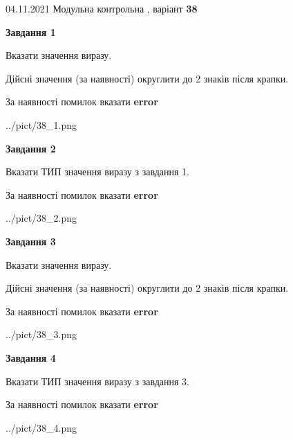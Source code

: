 \documentclass[11pt, ukrainian]{article}
\begin{document}
{04.11.2021 Модульна контрольна , варіант  \No \textbf { 38 }\par}
{
\begin {large}
{\begin {center}\textbf{Завдання 1}\end {center}}\par
Вказати значення виразу. \par
Дійсні значення (за наявності) округлити до 2 знаків після крапки. \par
За наявності помилок вказати \textbf{error}

\begin{center}
	{../pict/38_1.png}
\end{center}
\newpage

{\begin {center}\textbf{Завдання 2}\end {center}}\par
Вказати ТИП значення виразу з завдання 1. \par
За наявності помилок вказати \textbf{error}

\begin{center}
	{../pict/38_2.png}
\end{center}
\newpage

{\begin {center}\textbf{Завдання 3}\end {center}}\par
Вказати значення виразу. \par
Дійсні значення (за наявності) округлити до 2 знаків після крапки. \par
За наявності помилок вказати \textbf{error}

\begin{center}
	{../pict/38_3.png}
\end{center}
\newpage

{\begin {center}\textbf{Завдання 4}\end {center}}\par
Вказати ТИП значення виразу з завдання 3. \par
За наявності помилок вказати \textbf{error}

\begin{center}
	{../pict/38_4.png}
\end{center}
\newpage


\end{large}}
\end{document}
